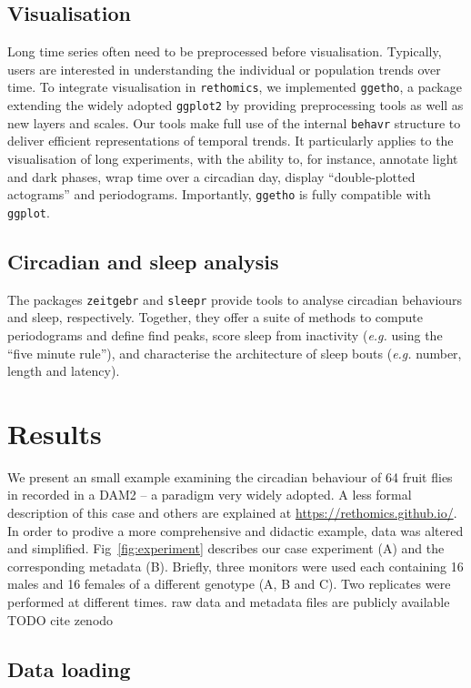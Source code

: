 \documentclass[10pt,letterpaper]{article}
\begin{document}
\subsection*{Visualisation}
Long time series often need to be preprocessed before visualisation.
Typically, users are interested in understanding the individual or population trends over time.
To integrate visualisation in \texttt{rethomics},
we implemented \texttt{ggetho}, a package extending the widely adopted \texttt{ggplot2} by providing preprocessing tools as well as new layers and scales.
Our tools make full use of the internal \texttt{behavr} structure to deliver efficient representations of temporal trends.
It particularly applies to the visualisation of long experiments, with the ability to, for instance, annotate light and dark phases, wrap time over a circadian day, display ``double-plotted actograms'' and periodograms. 
Importantly, \texttt{ggetho} is fully compatible with \texttt{ggplot}.

\subsection*{Circadian and sleep analysis}
The packages \texttt{zeitgebr} and \texttt{sleepr} provide tools to analyse circadian behaviours and sleep, respectively.
Together, they offer a suite of methods to compute periodograms and define find peaks, score sleep from inactivity (\emph{e.g.} using the ``five minute rule''), and characterise the architecture of sleep bouts (\emph{e.g.} number, length and latency).


\section*{Results}
We present an small example examining the circadian behaviour of 64 fruit flies in recorded in a DAM2 -- a paradigm very widely adopted. 
A less formal description of this case and others are explained at \href{https://rethomics.github.io/}{https://rethomics.github.io/}.
In order to prodive a more comprehensive and didactic example, data was altered and simplified.	
Fig~\ref{fig:experiment} describes our case experiment (A) and the corresponding metadata (B).
Briefly, three monitors were used each containing 16 males and 16 females of a different genotype (A, B and C).
Two replicates were performed at different times.
raw data and metadata files are publicly available TODO cite zenodo

\subsection*{Data loading}
\end{document}
